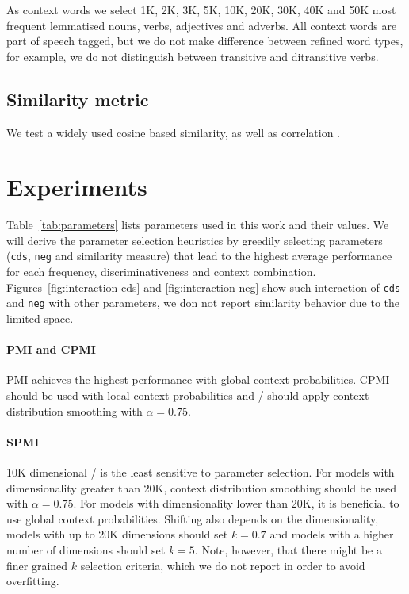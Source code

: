 \documentclass[11pt]{article}
\begin{document}
As context words we select 1K, 2K, 3K, 5K, 10K, 20K, 30K, 40K and 50K most frequent lemmatised nouns, verbs, adjectives and adverbs. All context words are part of speech tagged, but we do not make difference between refined word types, for example, we do not distinguish between transitive and ditransitive verbs.

\subsection{Similarity metric}
\label{sec:similarity-metric}

We test a widely used cosine based similarity, as well as correlation \cite{kiela-clark:2014:CVSC}.

\section{Experiments}
\label{sec:lexical-experiments}

Table~\ref{tab:parameters} lists parameters used in this work and their values. We will derive the parameter selection heuristics by greedily selecting parameters (\texttt{cds}, \texttt{neg} and similarity measure) that lead to the highest average performance for each frequency, discriminativeness and context combination. Figures~\ref{fig:interaction-cds} and \ref{fig:interaction-neg} show such interaction of \texttt{cds} and \texttt{neg} with other parameters, we don not report similarity behavior due to the limited space.

\paragraph{PMI and CPMI}

PMI achieves the highest performance with global context probabilities. CPMI should be used with local context probabilities and \CPMI/ should apply context distribution smoothing with $\alpha = 0.75$.

\paragraph{SPMI}

10K dimensional \SPMI/ is the least sensitive to parameter selection. For models with dimensionality greater than 20K, context distribution smoothing should be used with $\alpha = 0.75$. For models with dimensionality lower than 20K, it is beneficial to use global context probabilities. Shifting also depends on the dimensionality, models with up to 20K dimensions should set $k = 0.7$ and models with a higher number of dimensions should set $k = 5$. Note, however, that there might be a finer grained $k$ selection criteria, which we do not report in order to avoid overfitting.
\end{document}
